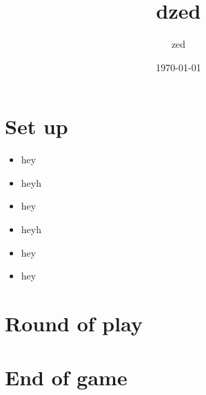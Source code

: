\documentclass{article}%
\title{dzed}%
\author{zed}%
\date{\today}%
\begin{document}
%
\pagestyle{empty}%
\normalsize%
\maketitle%
\section{ Set up
}%
\label{sec:Setup}%
\begin{itemize}%
\item%
 hey
%
\item%
 heyh
%
\item%
 hey
%
\end{itemize}%
\begin{itemize}%
\item%
 heyh
%
\item%
 hey
%
\end{itemize}%
\begin{itemize}%
\item%
 hey
%
\end{itemize}

%
\section{ Round of play
}%
\label{sec:Roundofplay}%

%
\section{ End of game}%
\label{sec:Endofgame}%

%
\end{document}
